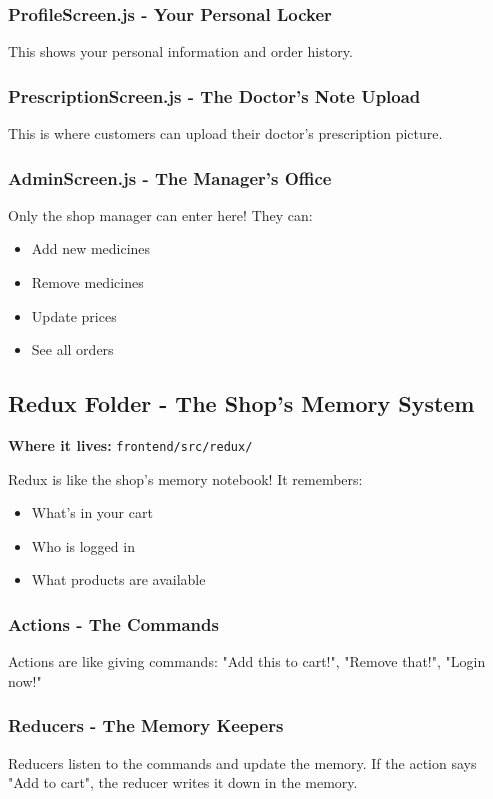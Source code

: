 \documentclass[12pt]{article}
\begin{document}
\subsubsection{ProfileScreen.js - Your Personal Locker}
This shows your personal information and order history.

\subsubsection{PrescriptionScreen.js - The Doctor's Note Upload}
This is where customers can upload their doctor's prescription picture.

\subsubsection{AdminScreen.js - The Manager's Office}
Only the shop manager can enter here! They can:
\begin{itemize}
    \item Add new medicines
    \item Remove medicines
    \item Update prices
    \item See all orders
\end{itemize}

\subsection{Redux Folder - The Shop's Memory System}

\textbf{Where it lives:} \texttt{frontend/src/redux/}

Redux is like the shop's memory notebook! It remembers:
\begin{itemize}
    \item What's in your cart
    \item Who is logged in
    \item What products are available
\end{itemize}

\subsubsection{Actions - The Commands}
Actions are like giving commands: "Add this to cart!", "Remove that!", "Login now!"

\subsubsection{Reducers - The Memory Keepers}
Reducers listen to the commands and update the memory. If the action says "Add to cart", the reducer writes it down in the memory.
\end{document}

